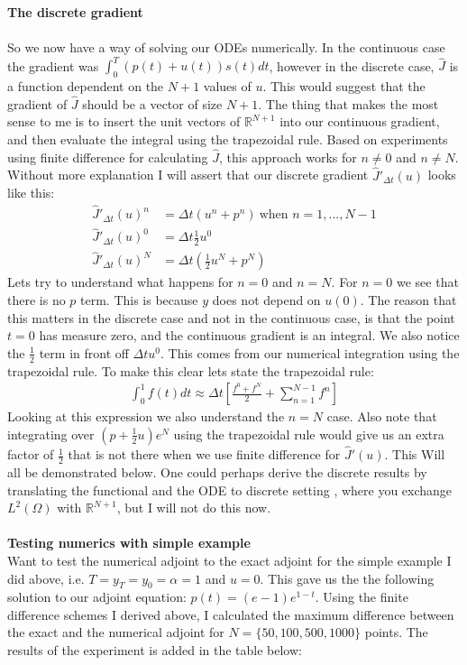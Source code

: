 \documentclass[11pt,a4paper]{article}
\begin{document}
\textbf{The discrete gradient}
\\
\\
So we now have a way of solving our ODEs numerically. In the continuous case the gradient was $\int_0^T(p(t)+u(t))s(t)dt$, however in the discrete case, $\hat{J}$ is a function dependent on the $N+1$ values of $u$. This would suggest that the gradient of $\hat{J}$ should be a vector of size $N+1$. The thing that makes the most sense to me is to insert the unit vectors of $\mathbb{R}^{N+1}$ into our continuous gradient, and then evaluate the integral using the trapezoidal rule. Based on experiments using finite difference for calculating $\hat{J}$, this approach works for $n\neq 0$ and $n\neq N$. Without more explanation I will assert that our discrete gradient $\hat{J}'_{\Delta t}(u)$ looks like this:
\begin{align*}
\hat{J}'_{\Delta t}(u)^n&=\Delta t(u^n+p^n) \ \text{when $n=1,...,N-1$} \\
\hat{J}'_{\Delta t}(u)^0&=\Delta t \frac{1}{2}u^0 \\
\hat{J}'_{\Delta t}(u)^N&=\Delta t(\frac{1}{2}u^N+p^N)
\end{align*} 
Lets try to understand what happens for $n=0$ and $n=N$. For $n=0$ we see that there is no $p$ term. This is because $y$ does not depend on $u(0)$. The reason that this matters in the discrete case and not in the continuous case, is that the point $t=0$ has measure zero, and the continuous gradient is an integral. We also notice the $\frac{1}{2}$ term in front off $\Delta t u^0$. This comes from our numerical integration using the trapezoidal rule. To make this clear lets state the trapezoidal rule:
\begin{align*}
\int_0^1 f(t)dt \approx \Delta t[\frac{f^0+f^N}{2}+\sum_{n=1}^{N-1}f^n]
\end{align*} 
Looking at this expression we also understand the $n=N$ case. Also note that integrating over $(p + \frac{1}{2}u)e^N$ using the trapezoidal rule would give us an extra factor of $\frac{1}{2}$ that is not there when we use finite difference for $\hat{J}'(u)$. This Will all be demonstrated below. One could perhaps derive the discrete results by translating the functional and the ODE to discrete setting , where you exchange $L^2(\Omega)$ with $\mathbb{R}^{N+1}$, but I will not do this now. 
\\
\\
\textbf{Testing numerics with simple example}
\\
Want to test the numerical adjoint to the exact adjoint for the simple example I did above, i.e. $T=y_T=y_0=\alpha=1$ and $u=0$. This gave us the the following solution to our adjoint equation: $p(t)=(e-1)e^{1-t}$. Using the finite difference schemes I derived above, I calculated the maximum difference between the exact and the numerical adjoint for $N=\{50,100,500,1000 \}$ points. The results of the experiment is added in the table below: 
\end{document}
